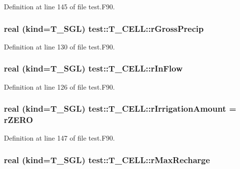 Definition at line 145 of file test.F90.

\hypertarget{typetest_1_1_t___c_e_l_l_a8360b2aeb6dabd62774564121921d569}{
\subsubsection[{rGrossPrecip}]{\setlength{\rightskip}{0pt plus 5cm}real (kind={\bf T\_\-SGL}) {\bf test::T\_\-CELL::rGrossPrecip}}}
\label{typetest_1_1_t___c_e_l_l_a8360b2aeb6dabd62774564121921d569}


Definition at line 130 of file test.F90.

\hypertarget{typetest_1_1_t___c_e_l_l_acdb8dbdf482542d991a44975edd4b8bc}{
\subsubsection[{rInFlow}]{\setlength{\rightskip}{0pt plus 5cm}real (kind={\bf T\_\-SGL}) {\bf test::T\_\-CELL::rInFlow}}}
\label{typetest_1_1_t___c_e_l_l_acdb8dbdf482542d991a44975edd4b8bc}


Definition at line 126 of file test.F90.

\hypertarget{typetest_1_1_t___c_e_l_l_aa6b89e6a922341235855da79acd6fedd}{
\subsubsection[{rIrrigationAmount}]{\setlength{\rightskip}{0pt plus 5cm}real (kind={\bf T\_\-SGL}) {\bf test::T\_\-CELL::rIrrigationAmount} = {\bf rZERO}}}
\label{typetest_1_1_t___c_e_l_l_aa6b89e6a922341235855da79acd6fedd}


Definition at line 147 of file test.F90.

\hypertarget{typetest_1_1_t___c_e_l_l_aab9340e6ec07642dd2e6766cf868f5fd}{
\subsubsection[{rMaxRecharge}]{\setlength{\rightskip}{0pt plus 5cm}real (kind={\bf T\_\-SGL}) {\bf test::T\_\-CELL::rMaxRecharge}}}
\label{typetest_1_1_t___c_e_l_l_aab9340e6ec07642dd2e6766cf868f5fd}


